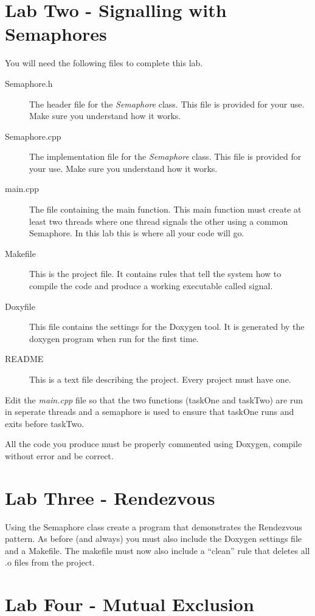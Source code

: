 \documentclass[10pt,a4paper]{article}
\begin{document}
\section{Lab Two - Signalling with Semaphores}
You will need the following files to complete this lab.
\begin{description}
\item[Semaphore.h] The header file for the \textit{Semaphore} class.  This file is provided for your use.  Make sure you understand how it works.
\item[Semaphore.cpp] The implementation file for the \textit{Semaphore} class.  This file is provided for your use.  Make sure you understand how it works.
\item[main.cpp] The file containing the main function.  This main function must create at least two threads where one thread signals the other using a common Semaphore.  In this lab this is where all your code will go.
\item[Makefile] This is the project file. It contains rules that tell the system how to compile the code and produce a working executable called signal.
\item[Doxyfile] This file contains the settings for the Doxygen tool. It is generated by the doxygen program when run for the first time.
\item[README] This is a text file describing the project. Every project must have one.
\end{description}

Edit the \textit{main.cpp} file so that the two functions (taskOne and taskTwo) are run in seperate threads and a semaphore is used to ensure that taskOne runs and exits before taskTwo.

All the code you produce must be properly commented using Doxygen, compile without error and be correct.
 
 \section{Lab Three - Rendezvous}
 Using the Semaphore class create a program that demonstrates the Rendezvous pattern.  As before (and always) you must also include the Doxygen settings file and a Makefile.  The makefile must now also include a “clean” rule that deletes all .o files from the project.
 
 \section{Lab Four - Mutual Exclusion}
\end{document}
